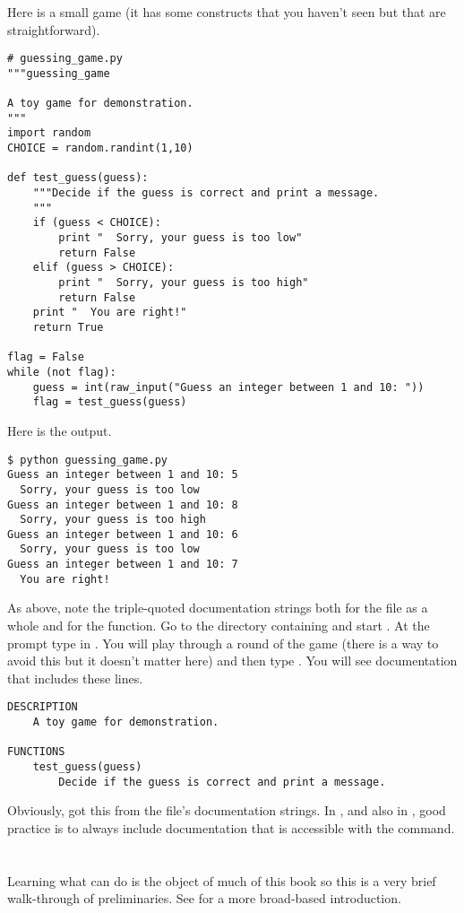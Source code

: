 Here is a small game (it has some \python{} constructs that
you haven't seen but that are straightforward).
\begin{lstlisting}[style=python]
# guessing_game.py
"""guessing_game

A toy game for demonstration.
"""
import random
CHOICE = random.randint(1,10)

def test_guess(guess):
    """Decide if the guess is correct and print a message.
    """
    if (guess < CHOICE):
        print "  Sorry, your guess is too low"
        return False
    elif (guess > CHOICE):
        print "  Sorry, your guess is too high"
        return False
    print "  You are right!"
    return True

flag = False
while (not flag):
    guess = int(raw_input("Guess an integer between 1 and 10: "))
    flag = test_guess(guess)
\end{lstlisting}
Here is the output.
\begin{lstlisting}
$ python guessing_game.py
Guess an integer between 1 and 10: 5
  Sorry, your guess is too low
Guess an integer between 1 and 10: 8
  Sorry, your guess is too high
Guess an integer between 1 and 10: 6
  Sorry, your guess is too low
Guess an integer between 1 and 10: 7
  You are right!
\end{lstlisting}  %

As above, note the triple-quoted documentation strings both for the 
file as a whole and for the function.
Go to the directory containing  and start \python{}.
At the prompt type in .
You will play through a round of the game (there is a way to avoid this
but it doesn't matter here) and then type
.
You will see documentation that includes these lines.
\begin{lstlisting}
DESCRIPTION
    A toy game for demonstration.

FUNCTIONS
    test_guess(guess)
        Decide if the guess is correct and print a message. 
\end{lstlisting}
Obviously, \python{} got this from the file's documentation strings.
In \python{}, and also in \Sage, good practice is 
to always include documentation
that is accessible with the  command.




\section{\Sage}
Learning what \Sage{} can do is the object of much of this book 
so this is a very
brief walk-through of preliminaries.
See \citep{SageTeam12} for a more broad-based introduction.

